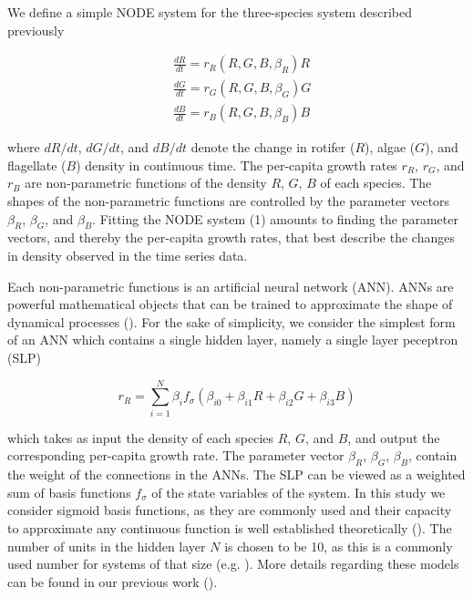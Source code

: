 \documentclass[11pt, oneside]{article}
\begin{document}
We define a simple NODE system for the three-species system described previously

\begin{equation} \begin{aligned}
	& \frac{dR}{dt} = r_R(R,G,B,\beta_R) R \\
	& \frac{dG}{dt} = r_G(R,G,B,\beta_G) G \\
	& \frac{dB}{dt} = r_B(R,G,B,\beta_B) B
\end{aligned} \end{equation}

where $dR/dt$, $dG/dt$, and $dB/dt$ denote the change in rotifer ($R$), algae ($G$), and flagellate ($B$) density in continuous time.
The per-capita growth rates $r_R$, $r_G$, and $r_B$ are non-parametric functions of the density $R$, $G$, $B$ of each species.
The shapes of the non-parametric functions are controlled by the parameter vectors $\beta_R$, $\beta_G$, and $\beta_B$.
Fitting the NODE system (1) amounts to finding the parameter vectors, and thereby the per-capita growth rates, that best describe the changes in density observed in the time series data. 

Each non-parametric functions is an artificial neural network (ANN).
ANNs are powerful mathematical objects that can be trained to approximate the shape of dynamical processes (\cite{Funahashi1993, Chen1993}).
For the sake of simplicity, we consider the simplest form of an ANN which contains a single hidden layer, namely a single layer peceptron (SLP)

\begin{equation}
	r_R = \sum_{i=1}^{N} \beta_{i} f_{\sigma} \left( \beta_{i0} + \beta_{i1} R + \beta_{i2} G + \beta_{i3} B \right) 
\end{equation}

which takes as input the density of each species $R$, $G$, and $B$, and output the corresponding per-capita growth rate.
The parameter vector $\beta_R$, $\beta_G$, $\beta_B$, contain the weight of the connections in the ANNs.
The SLP can be viewed as a weighted sum of basis functions $f_\sigma$ of the state variables of the system.
In this study we consider sigmoid basis functions, as they are commonly used and their capacity to approximate any continuous function is well established theoretically (\cite{Funahashi1993}). 
The number of units in the hidden layer $N$ is chosen to be 10, as this is a commonly used number for systems of that size (e.g. \cite{Wu2005}). 
More details regarding these models can be found in our previous work (\cite{Bonnaffe2021a}).
\end{document}
